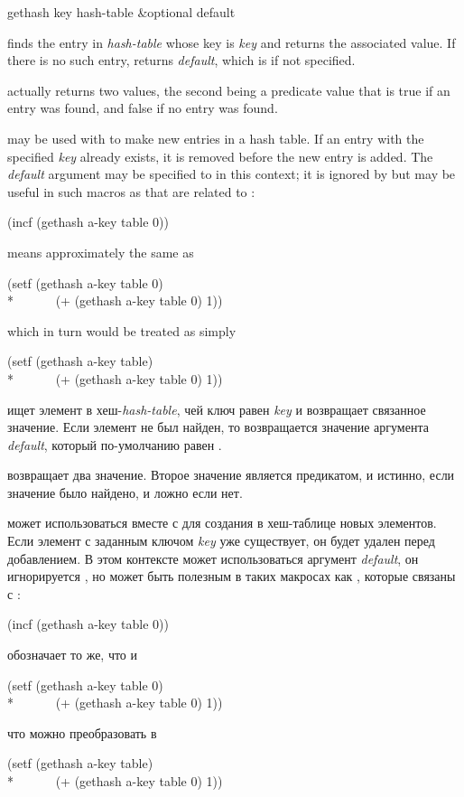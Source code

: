 \begin{defun}[Function]
gethash key hash-table &optional default

 finds the entry in \emph{hash-table} whose key is \emph{key}
and returns the
associated value.  If there is no such entry,  returns \emph{default},
which is {\false} if not specified.

 actually returns two values, the second being a predicate
value that is true if an entry was found, and false if no entry was found.

 may be used with  to make new entries in a hash
table.  If an entry with the specified \emph{key} already exists, it is
removed before the new entry is added.  The \emph{default} argument may be
specified to  in this context; it is ignored by 
but may be useful in such macros as  that are related to :
\begin{lisp}
(incf (gethash a-key table 0))
\end{lisp}
means approximately the same as
\begin{lisp}
(setf (gethash a-key table 0) \\*
~~~~~~(+ (gethash a-key table 0) 1))
\end{lisp}
which in turn would be treated as simply
\begin{lisp}
(setf (gethash a-key table) \\*
~~~~~~(+ (gethash a-key table 0) 1))
\end{lisp}

 ищет элемент в хеш-\emph{hash-table}, чей ключ равен \emph{key} и
возвращает связанное значение. Если элемент не был найден, то возвращается
значение аргумента \emph{default}, который по-умолчанию равен {\false}.

 возвращает два значение. Второе значение является предикатом, и
истинно, если значение было найдено, и ложно если нет.

 может использоваться вместе с  для создания в
хеш-таблице новых элементов. Если элемент с заданным ключом \emph{key} уже
существует, он будет удален перед добавлением. В этом контексте может
использоваться аргумент \emph{default}, он игнорируется , но может
быть полезным в таких макросах как , которые связаны с :
\begin{lisp}
(incf (gethash a-key table 0))
\end{lisp}
обозначает то же, что и 
\begin{lisp}
(setf (gethash a-key table 0) \\*
~~~~~~(+ (gethash a-key table 0) 1))
\end{lisp}
что можно преобразовать в
\begin{lisp}
(setf (gethash a-key table) \\*
~~~~~~(+ (gethash a-key table 0) 1))
\end{lisp}
\end{defun}

